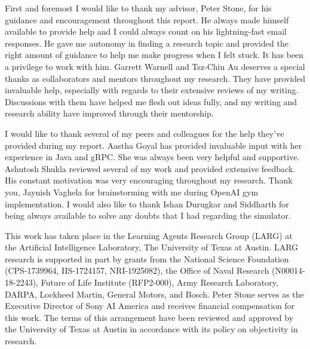 \documentclass[12pt]{report}
\begin{document}
\justify 
\noindent

\thesiscopyrightpage                 

\thesiscertificationpage             

\thesistitlepage                     



\begin{thesisacknowledgments}       
First and foremost I would like to thank my advisor, Peter Stone, for his guidance and encouragement throughout this report. He always made himself available to provide help and I could always count on his lightning-fast email responses. He gave me autonomy in finding a research topic and provided the right amount of guidance to help me make progress when I felt stuck. It has been a privilege to work with him. Garrett Warnell and Tsz-Chiu Au deserves a special thanks as collaborators and mentors throughout my research. They have provided invaluable help, especially with regards to their extensive reviews of my writing. Discussions with them have helped me flesh out ideas fully, and my writing and research ability have improved through their mentorship.    

I would like to thank several of my peers and colleagues for the help they’ve provided during my report. Aastha Goyal has provided invaluable input with her experience in Java and gRPC. She was always been very helpful and supportive. Ashutosh Shukla reviewed several of my work and provided extensive feedback. His constant motivation was very encouraging throughout my research. Thank you, Jaynish Vaghela for brainstorming with me during OpenAI gym implementation. I would also like to thank Ishan Durugkar and Siddharth for being always available to solve any doubts that I had regarding the simulator. 

This work has taken place in the Learning Agents Research Group (LARG) at the Artificial Intelligence Laboratory, The University of Texas at Austin.  LARG research is supported in part by grants from
the National Science Foundation (CPS-1739964, IIS-1724157, NRI-1925082), the Office of Naval Research (N00014-18-2243), Future of Life Institute (RFP2-000), Army Research Laboratory, DARPA, Lockheed
Martin, General Motors, and Bosch.  Peter Stone serves as the Executive Director of Sony AI America and receives financial compensation for this work.  The terms of this arrangement have been reviewed and approved by the University of Texas at Austin in accordance with its policy on objectivity in research. 

\end{thesisacknowledgments}          
\end{document}
